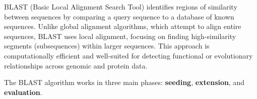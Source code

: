 BLAST (Basic Local Alignment Search Tool)
identifies regions of similarity between sequences by comparing a query sequence to a database of known sequences. Unlike global alignment algorithms, which attempt to align entire sequences, BLAST uses local alignment, focusing on finding high-similarity segments (subsequences) within larger sequences. This approach is computationally efficient and well-suited for detecting functional or evolutionary relationships across genomic and protein data.

The BLAST algorithm works in three main phases: \textbf{seeding}, \textbf{extension}, and \textbf{evaluation}.

